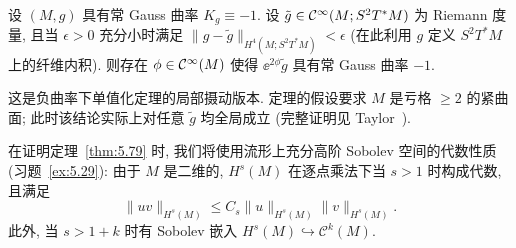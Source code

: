 \begin{theorem}[负曲率单值化定理的局部版本]\label{thm:5.79}
设 $(M, g)$ 具有常 Gauss 曲率 $K_g \equiv -1$. 设 $\tilde{g} \in \mathcal{C}^\infty(M; S^2 T^* M)$ 为 Riemann 度量, 且当 $\epsilon > 0$ 充分小时满足 $\|g - \tilde{g}\|_{H^4(M; S^2 T^* M)} < \epsilon$ (在此利用 $g$ 定义 $S^2 T^* M$ 上的纤维内积). 则存在 $\phi \in \mathcal{C}^\infty(M)$ 使得 $\ee^{2\phi} \tilde{g}$ 具有常 Gauss 曲率 $-1$.
\end{theorem}

这是负曲率下单值化定理的局部摄动版本. 定理的假设要求 $M$ 是亏格 $\ge 2$ 的紧曲面; 此时该结论实际上对任意 $\tilde{g}$ 均全局成立 (完整证明见 Taylor~\cite[第 14.2 章]{Tay11c}).

在证明定理~\ref{thm:5.79} 时, 我们将使用流形上充分高阶 Sobolev 空间的代数性质 (习题~\ref{ex:5.29}): 由于 $M$ 是二维的, $H^s(M)$ 在逐点乘法下当 $s > 1$ 时构成代数, 且满足
\begin{equation}\label{eq:5.176}
    \|u v\|_{H^s(M)} \le C_s \|u\|_{H^s(M)} \|v\|_{H^s(M)}.
\end{equation}
此外, 当 $s > 1 + k$ 时有 Sobolev 嵌入 $H^s(M) \hookrightarrow \mathcal{C}^k(M)$.

